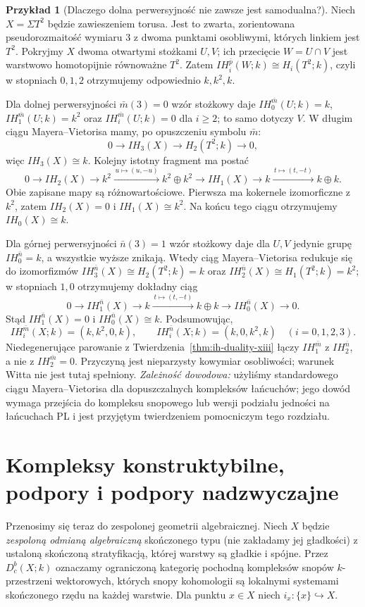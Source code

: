 \documentclass[11pt,a4paper,oneside]{report}
\theoremstyle{plain}
\theoremstyle{definition}
\newtheorem{przyklad}[twierdzenie]{Przykład}
\theoremstyle{remark}
\begin{document}
\begin{przyklad}[Dlaczego dolna perwersyjność nie zawsze jest samodualna?]
\label{ex:suspension-torus-xiii}
Niech $X=\Sigma T^2$ będzie zawieszeniem torusa.
Jest to zwarta, zorientowana pseudorozmaitość wymiaru $3$
z dwoma punktami osobliwymi, których linkiem jest $T^2$.
Pokryjmy $X$ dwoma otwartymi stożkami $U,V$; ich
przecięcie $W=U\cap V$ jest warstwowo homotopijnie
równoważne $T^2$. Zatem
$IH_i^{\bar p}(W;k)\cong H_i(T^2;k)$, czyli
w stopniach $0,1,2$ otrzymujemy odpowiednio $k,k^2,k$.

Dla dolnej perwersyjności $\bar m(3)=0$ wzór
stożkowy daje
$IH_0^{\bar m}(U;k)=k$,
$IH_1^{\bar m}(U;k)=k^2$ oraz
$IH_i^{\bar m}(U;k)=0$ dla $i\ge2$;
to samo dotyczy $V$. W długim ciągu
Mayera--Vietorisa mamy, po opuszczeniu
symbolu $\bar m$:
\[
0\longrightarrow IH_3(X)\longrightarrow
H_2(T^2;k)\longrightarrow0,
\]
więc $IH_3(X)\cong k$. Kolejny istotny
fragment ma postać
\[
0\longrightarrow IH_2(X)\longrightarrow
k^2\xrightarrow{\,u\mapsto(u,-u)\,}k^2\oplus k^2
\longrightarrow IH_1(X)\longrightarrow
k\xrightarrow{\,t\mapsto(t,-t)\,}k\oplus k.
\]
Obie zapisane mapy są różnowartościowe.
Pierwsza ma kokernele izomorficzne z $k^2$,
zatem $IH_2(X)=0$ i $IH_1(X)\cong k^2$.
Na końcu tego ciągu otrzymujemy $IH_0(X)\cong k$.

Dla górnej perwersyjności $\bar n(3)=1$ wzór
stożkowy daje dla $U,V$ jedynie grupę
$IH_0^{\bar n}=k$, a wszystkie wyższe znikają.
Wtedy ciąg Mayera--Vietorisa redukuje się
do izomorfizmów
$IH_3^{\bar n}(X)\cong H_2(T^2;k)=k$ oraz
$IH_2^{\bar n}(X)\cong H_1(T^2;k)=k^2$;
w stopniach $1,0$ otrzymujemy dokładny ciąg
\[
0\longrightarrow IH_1^{\bar n}(X)
\longrightarrow k\xrightarrow{\,t\mapsto(t,-t)\,}
k\oplus k\longrightarrow IH_0^{\bar n}(X)
\longrightarrow0.
\]
Stąd $IH_1^{\bar n}(X)=0$ i
$IH_0^{\bar n}(X)\cong k$.
Podsumowując,
\[
IH_i^{\bar m}(X;k)=(k,k^2,0,k),\qquad
IH_i^{\bar n}(X;k)=(k,0,k^2,k)
\quad (i=0,1,2,3).
\]
Niedegenerujące parowanie z
Twierdzenia~\ref{thm:ih-duality-xiii} łączy
$IH_1^{\bar m}$ z $IH_2^{\bar n}$,
a nie z $IH_2^{\bar m}=0$.
Przyczyną jest nieparzysty kowymiar osobliwości;
warunek Witta nie jest tutaj spełniony.
\emph{Zależność dowodowa:} użyliśmy standardowego
ciągu Mayera--Vietorisa dla dopuszczalnych kompleksów
łańcuchów; jego dowód wymaga przejścia do
kompleksu snopowego lub wersji podziału jedności
na łańcuchach PL i jest przyjętym twierdzeniem
pomocniczym tego rozdziału.
\end{przyklad}

\section{Kompleksy konstruktybilne, podpory i podpory nadzwyczajne}
Przenosimy się teraz do zespolonej geometrii
algebraicznej. Niech $X$ będzie \emph{zespoloną odmianą
algebraiczną} skończonego typu (nie zakładamy jej
gładkości) z ustaloną skończoną
stratyfikacją, której warstwy są gładkie i spójne.
Przez $D_c^b(X;k)$ oznaczamy ograniczoną kategorię
pochodną kompleksów snopów $k$-przestrzeni wektorowych,
których snopy kohomologii są lokalnymi systemami
skończonego rzędu na każdej warstwie.
Dla punktu $x\in X$ niech $i_x:\{x\}\hookrightarrow X$.
\end{document}
